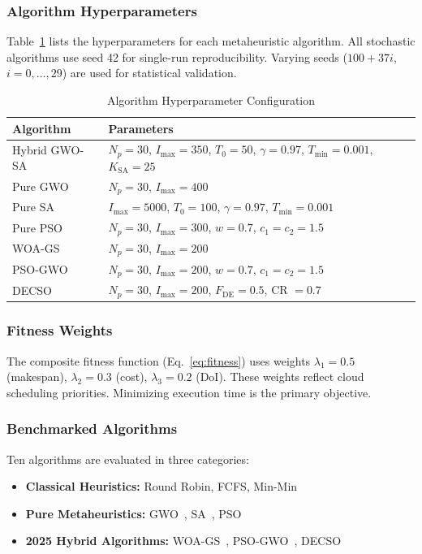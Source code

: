 \documentclass[conference]{IEEEtran}
\begin{document}
\subsubsection{Algorithm Hyperparameters}
Table~\ref{tab:params} lists the hyperparameters for each metaheuristic algorithm.
All stochastic algorithms use seed 42 for single-run reproducibility.
Varying seeds ($100 + 37i$, $i = 0, \ldots, 29$) are used for statistical validation.

\begin{table}[!t]
\centering
\caption{Algorithm Hyperparameter Configuration}
\label{tab:params}
\begin{tabular}{lp{5.2cm}}
\toprule
\textbf{Algorithm} & \textbf{Parameters} \\
\midrule
Hybrid GWO-SA & $N_p = 30$, $I_{\max} = 350$, $T_0 = 50$, $\gamma = 0.97$, $T_{\min} = 0.001$, $K_{\text{SA}} = 25$ \\
Pure GWO & $N_p = 30$, $I_{\max} = 400$ \\
Pure SA & $I_{\max} = 5000$, $T_0 = 100$, $\gamma = 0.97$, $T_{\min} = 0.001$ \\
Pure PSO & $N_p = 30$, $I_{\max} = 300$, $w = 0.7$, $c_1 = c_2 = 1.5$ \\
WOA-GS~\cite{acharya2025hybrid} & $N_p = 30$, $I_{\max} = 200$ \\
PSO-GWO~\cite{kumari2025hybrid} & $N_p = 30$, $I_{\max} = 200$, $w = 0.7$, $c_1 = c_2 = 1.5$ \\
DECSO~\cite{gunduz2025hybrid} & $N_p = 30$, $I_{\max} = 200$, $F_{\text{DE}} = 0.5$, CR $= 0.7$ \\
\bottomrule
\end{tabular}
\end{table}

\subsubsection{Fitness Weights}
The composite fitness function (Eq.~\ref{eq:fitness}) uses weights
$\lambda_1 = 0.5$ (makespan), $\lambda_2 = 0.3$ (cost), $\lambda_3 = 0.2$ (DoI).
These weights reflect cloud scheduling priorities.
Minimizing execution time is the primary objective.

\subsubsection{Benchmarked Algorithms}
Ten algorithms are evaluated in three categories:
\begin{itemize}
    \item \textbf{Classical Heuristics:} Round Robin, FCFS, Min-Min
    \item \textbf{Pure Metaheuristics:} GWO~\cite{mirjalili2014grey}, SA~\cite{kirkpatrick1983optimization}, PSO~\cite{kennedy1995particle}
    \item \textbf{2025 Hybrid Algorithms:} WOA-GS~\cite{acharya2025hybrid}, PSO-GWO~\cite{kumari2025hybrid}, DECSO~\cite{gunduz2025hybrid}
\end{itemize}
\end{document}
